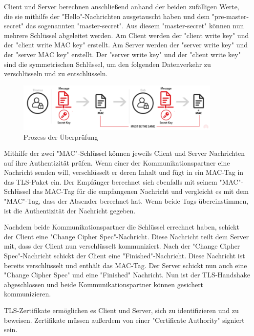 Client und Server berechnen anschließend anhand der beiden zufälligen Werte, die sie mithilfe der "Hello"-Nachrichten ausgetauscht haben und dem "pre-master-secret" das sogenannten "master-secret". Aus diesem "master-secret" können nun mehrere Schlüssel abgeleitet werden. Am Client werden der "client write key" und der "client write MAC key" erstellt. Am Server werden der "server write key" und der "server MAC key" erstellt. Der "server write key" und der "client write key" sind die symmetrischen Schlüssel, um den folgenden Datenverkehr zu verschlüsseln und zu entschlüsseln. \cite{WikiTLS}

\begin{figure}[H]
    \centering
    \includegraphics[width=0.9\textwidth]{media/OpenSSL/key.png}
    \caption{Prozess der Überprüfung \cite{TerminologyTLS}} 
\end{figure}

Mithilfe der zwei "MAC"-Schlüssel können jeweils Client und Server Nachrichten auf ihre Authentizität prüfen. Wenn einer der Kommunikationspartner eine Nachricht senden will, verschlüsselt er deren Inhalt und fügt in ein MAC-Tag in das TLS-Paket ein. Der Empfänger berechnet sich ebenfalls mit seinem "MAC"-Schlüssel das MAC-Tag für die empfangenen Nachricht und vergleicht es mit dem "MAC"-Tag, dass der Absender berechnet hat. Wenn beide Tags übereinstimmen, ist die Authentizität der Nachricht gegeben.

Nachdem beide Kommunikationspartner die Schlüssel errechnet haben, schickt der Client eine "Change Cipher Spec"-Nachricht. Diese Nachricht teilt dem Server mit, dass der Client nun verschlüsselt kommuniziert. Nach der "Change Cipher Spec"-Nachricht schickt der Client eine "Finished"-Nachricht. Diese Nachricht ist bereits verschlüsselt und enthält das MAC-Tag. Der Server schickt nun auch eine "Change Cipher Spec" und eine "Finished" Nachricht. Nun ist der TLS-Handshake abgeschlossen und beide Kommunikationspartner können gesichert kommunizieren. \cite{SessionKeyTLS}


TLS-Zertifikate ermöglichen es Client und Server, sich zu identifizieren und zu beweisen. Zertifikate müssen außerdem von einer "Certificate Authority" signiert sein. 

